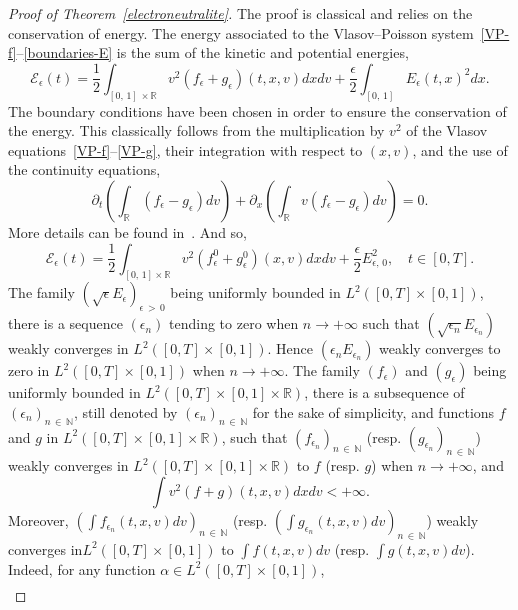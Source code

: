\documentclass[AHL,Unicode,longabstracts,published]{cedram}
\newcommand{\R}{\mathbb{R}}
\newcommand{\N}{\mathbb{N}}
\newcommand{\clE}{\mathcal{E}}
\begin{document}
\begin{proof}[{Proof of Theorem~\ref{electroneutralite}}]
The proof is classical and relies on the conservation of energy. The energy associated to the Vlasov--Poisson system~\eqref{VP-f}--\eqref{boundaries-E} is the sum of the kinetic and potential energies,
\begin{equation}\label{energy}
\clE_{\epsilon }(t) = \frac{1}{2} \int_{[0,\,1]\, \times\R } v^2 \left(f_{\epsilon } + g_{\epsilon }\right)(t,x,v) dxdv + \frac{\epsilon }{2} \int_{[0,\,1]} E_{\epsilon}(t,x)^2 dx.
\end{equation}
The boundary conditions have been chosen in order to ensure the conservation of the energy. This classically follows from the multiplication by $v^2$ of the Vlasov equations~\eqref{VP-f}--\eqref{VP-g}, their integration with respect to $(x,v)$, and the use of the continuity equations,
\[
\partial_t \left(\int_{\R } \left(f_{\epsilon } -g_{\epsilon }\right) dv \right) + \partial_x \left(\int_{\R } v \left(f_{\epsilon }-g_{\epsilon }\right) dv \right) = 0.
\]
More details can be found in~\cite{Gio19}. And so,
\[
\clE_{\epsilon }(t) = \frac{1}{2}\int_{[0,\,1] \times \R } v^2 \left(f_{\epsilon }^0 + g_{\epsilon }^0\right)(x,v)dxdv + \frac{\epsilon }{2} E_{\epsilon,\,0}^2,\quad t\in [0,T].
\]
The family $(\sqrt{\epsilon } E_{\epsilon })_{\epsilon\,>\,0}$ being uniformly bounded in $L^2([0,T] \times [0,1])$, there is a sequence $(\epsilon _n)$ tending to zero when $n \to +\infty $ such that $(\sqrt{\epsilon _n} E_{\epsilon _n})$ weakly converges in $L^2([0,T] \times [0,1])$. Hence $(\epsilon _n E_{\epsilon _n})$ weakly converges to zero in $L^2([0,T]\times [0,1])$ when $n \to +\infty $. The family $(f_{\epsilon })$ and $(g_{\epsilon })$ being uniformly bounded in $L^2([0,T] \times [0,1] \times\R)$, there is a subsequence of $(\epsilon _n)_{n\,\in\,\N}$, still denoted by $(\epsilon _n)_{n\,\in\,\N}$ for the sake of simplicity, and functions $f$ and $g$ in $L^2([0,T] \times [0,1] \times \R)$, such that $(f_{\epsilon_n})_{n\,\in\,\N}$ (resp. $(g_{\epsilon _n})_{n\,\in\,\N}$) weakly converges in $L^2([0,T] \times [0,1] \times \R)$ to $f$ (resp. $g$) when $n\rightarrow +\infty $, and
\[
\int v^2(f+g)(t,x,v) dxdv < +\infty.
\]
Moreover, $(\int f_{\epsilon _n}(t,x,v) dv)_{n\, \in\,\N} $ (resp. $(\int g_{\epsilon_n}(t,x,v) dv)_{n\,\in\,\N} $) weakly converges in\linebreak $L^2([0,T]\times [0,1])$ to $\int f(t,x,v) dv$ (resp. $\int g(t,x,v) dv$). Indeed, for any function $\alpha \in L^2([0,T] \times [0,1])$,
\begin{multline}\label{weak-cv-of-rho-n}

\end{multline}
\end{proof}
\end{document}
